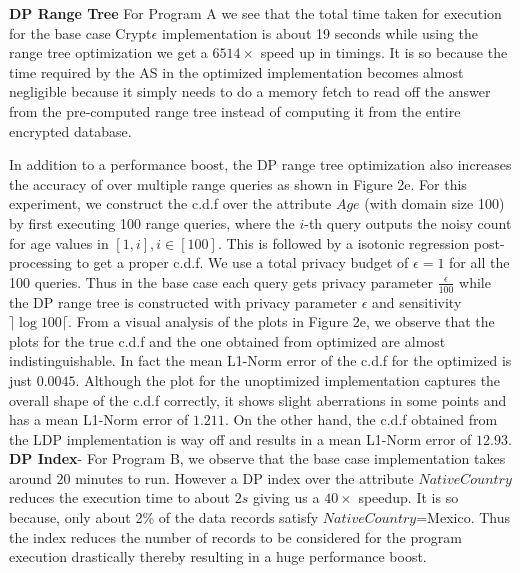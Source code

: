 \textbf{DP Range Tree}
 For Program A we see that the total time taken for execution for the base case Crypt$\epsilon$ implementation is about 19 seconds while using the range tree optimization we get a $6514\times$ speed up in timings. It is so because the time required by the \textsf{AS} in the optimized implementation becomes almost negligible because it simply needs to do a memory fetch to read off the answer from the pre-computed range tree instead of computing it from the entire encrypted database. 
 
 In addition  to a performance boost, the DP range tree optimization also increases the accuracy of \system over multiple range queries as shown in Figure 2e. For this experiment, we construct the c.d.f over the attribute $Age$ (with domain size 100) by first executing 100 range queries, where the $i$-th query outputs the noisy count for age values in $[1,i], i \in [100]$. %
 This is followed by a isotonic regression post-processing to get a proper c.d.f. We use a total privacy budget of $\epsilon=1$ for all the 100 queries. Thus in the base case each query gets privacy parameter $\frac{\epsilon}{100}$ while the DP range tree is constructed with privacy parameter $\epsilon$ and sensitivity $\rceil\log 100\lceil$. From a visual analysis of the plots in Figure 2e, we observe that the plots for the true c.d.f and the one obtained from optimized \system are almost indistinguishable. In fact the mean L1-Norm error of the c.d.f for the optimized \system is just $0.0045$. Although the plot for the unoptimized implementation \system captures the overall shape of the c.d.f correctly, it shows slight aberrations in some points and has a mean L1-Norm error of $1.211$. On the other hand, the c.d.f obtained from the \textsf{LDP} implementation is way off and results in a mean L1-Norm error of $12.93$.
\\\textbf{DP Index}- For Program B, we observe that the base case implementation takes around $20$ minutes to run. However  a DP index over the attribute $NativeCountry$  reduces the execution time to about $2s$ giving us a $40\times $ speedup. It is so because, only about 2\% of the data records satisfy $NativeCountry$=Mexico. Thus the index reduces the number of records to be considered for the program execution drastically thereby resulting in a huge performance boost. %
